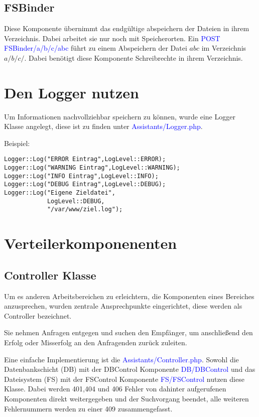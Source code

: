 \documentclass[10pt,a4paper,final,parskip]{scrartcl}
\newcommand{\blau}[1]{\textcolor{blue}{#1}}
\begin{document}
\subsection{FSBinder}
Diese Komponente übernimmt das endgültige abspeichern der Dateien in ihrem Verzeichnis. Dabei arbeitet sie nur noch mit Speicherorten. Ein \blau{POST FSBinder/a/b/c/abc} führt zu einem Abspeichern der Datei $abc$ im Verzeichnis $a/b/c/$. Dabei benötigt diese Komponente Schreibrechte in ihrem Verzeichnis.
  


\section{Den Logger nutzen}
Um Informationen nachvollziehbar speichern zu können, wurde eine Logger Klasse angelegt, diese ist zu finden unter \blau{Assistants/Logger.php}.

\begin{minipage}{\textwidth}
Beispiel:
\begin{lstlisting}
Logger::Log("ERROR Eintrag",LogLevel::ERROR);
Logger::Log("WARNING Eintrag",LogLevel::WARNING);
Logger::Log("INFO Eintrag",LogLevel::INFO);
Logger::Log("DEBUG Eintrag",LogLevel::DEBUG);
Logger::Log("Eigene Zieldatei",
            LogLevel::DEBUG, 
            "/var/www/ziel.log");
\end{lstlisting}
\end{minipage}
 
\section{Verteilerkomponenenten}
\subsection{Controller Klasse}
Um es anderen Arbeitsbereichen zu erleichtern, die Komponenten eines Bereiches anzusprechen, wurden zentrale Ansprechpunkte eingerichtet, diese werden als Controller bezeichnet.

Sie nehmen Anfragen entgegen und suchen den Empfänger, um anschließend den Erfolg oder Misserfolg an den Anfragenden zurück zuleiten.

Eine einfache Implementierung ist die \blau{Assistants/Controller.php}. Sowohl die Datenbankschicht (DB) mit der DBControl Komponente \blau{DB/DBControl} und das Dateisystem (FS) mit der FSControl Komponente \blau{FS/FSControl} nutzen diese Klasse. Dabei werden 401,404 und 406 Fehler von dahinter aufgerufenen Komponenten direkt weitergegeben und der Suchvorgang beendet, alle weiteren Fehlernummern werden zu einer 409 zusammengefasst.
\end{document}
